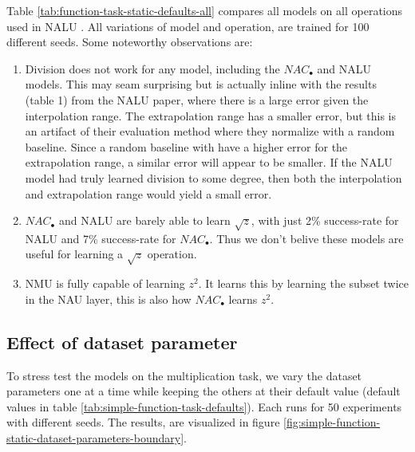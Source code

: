 Table \ref{tab:function-task-static-defaults-all} compares all models on all operations used in NALU \cite{trask-nalu}. All variations of model and operation, are trained for 100 different seeds. Some noteworthy observations are:

\begin{enumerate}
    \item Division does not work for any model, including the $NAC_{\bullet}$ and NALU models. This may seam surprising but is actually inline with the results (table 1) from the NALU paper, where there is a large error given the interpolation range. The extrapolation range has a smaller error, but this is an artifact of their evaluation method where they normalize with a random baseline. Since a random baseline with have a higher error for the extrapolation range, a similar error will appear to be smaller. If the NALU model had truly learned division to some degree, then both the interpolation and extrapolation range would yield a small error.
    \item $NAC_{\bullet}$ and NALU are barely able to learn $\sqrt{z}$, with just 2\% success-rate for NALU and 7\% success-rate for $NAC_{\bullet}$. Thus we don't belive these models are useful for learning a $\sqrt{z}$ operation.
    \item NMU is fully capable of learning $z^2$. It learns this by learning the subset twice in the NAU layer, this is also how $NAC_{\bullet}$ learns $z^2$.
\end{enumerate}



\subsection{Effect of dataset parameter}
\label{sec:appendix-simple-function-task:dataset-parameter-effect}

To stress test the models on the multiplication task, we vary the dataset parameters one at a time while keeping the others at their default value (default values in table \ref{tab:simple-function-task-defaults}). Each runs for 50 experiments with different seeds. The results, are visualized in figure \ref{fig:simple-function-static-dataset-parameters-boundary}.

